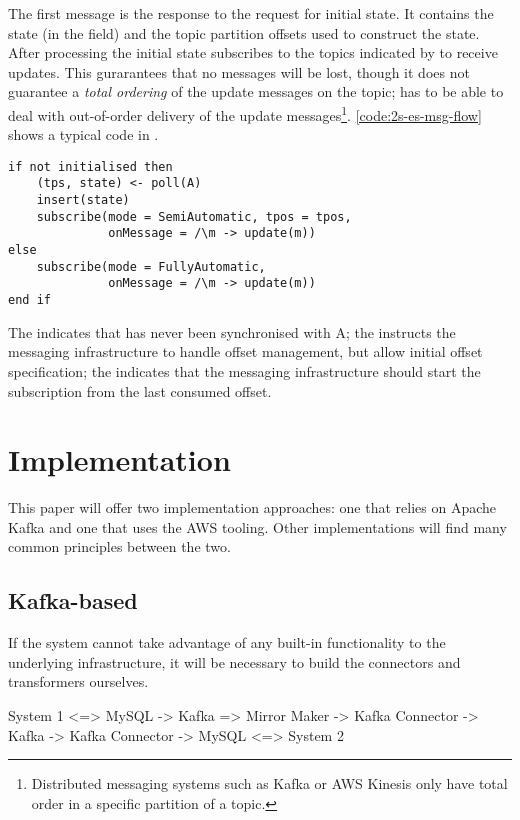 \documentclass[10 pt, twocolumn]{article}
\begin{document}

The first message is the response to the request for initial state. It contains the state (in the  field) and the topic partition offsets used to construct the state. After processing the initial state  subscribes to the topics indicated by  to receive updates. This gurarantees that no messages will be lost, though it does not guarantee a \emph{total ordering} of the update messages on the topic;  has to be able to deal with out-of-order delivery of the update messages\footnote{Distributed messaging systems such as Kafka\cite{kafka} or AWS Kinesis\cite{kinesis} only have total order in a specific partition of a topic.}. \autoref{code:2s-es-msg-flow} shows a typical code in .


\begin{lstlisting}[caption={Message flow}, label={code:2s-es-msg-flow}, language=Pseudo, escapechar=|]
if not initialised then 
    (tps, state) <- poll(A)
    insert(state)
    subscribe(mode = SemiAutomatic, tpos = tpos, 
              onMessage = /\m -> update(m))
else
    subscribe(mode = FullyAutomatic,
              onMessage = /\m -> update(m))
end if
\end{lstlisting}

The  indicates that  has never been synchronised with A; the  instructs the messaging infrastructure to handle offset management, but allow initial offset specification; the  indicates that the messaging infrastructure should start the subscription from the last consumed offset.

\section{Implementation}
This paper will offer two implementation approaches: one that relies on Apache Kafka and one that uses the AWS tooling. Other implementations will find many common principles between the two.

\subsection{Kafka-based}
If the system cannot take advantage of any built-in functionality to the underlying infrastructure, it will be necessary to build the connectors and transformers ourselves. 

System 1 <=> MySQL
          -> Kafka => Mirror Maker -> Kafka Connector -> Kafka -> Kafka Connector -> MySQL <=> System 2
\end{document}

